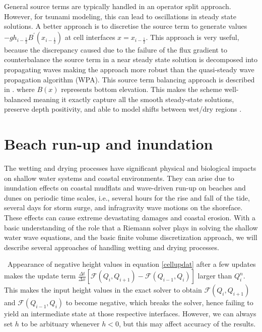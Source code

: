 \documentclass[11pt,a4paper]{article}
\newcommand{\donna}[1]{{\color{red}{#1}}}
\begin{document}
	General source terms are typically handled in an operator split approach.  However, for tsunami modeling, this can lead to oscillations in steady state solutions.  A better approach is to discretise the source term to generate values $-gh_{i-\frac{1}{2}}B^{\prime}(x_{i-\frac{1}{2}})$ at  cell interfaces  $x = x_{i-\frac{1}{2}}$. This approach is very useful, because the discrepancy caused due to the failure of the flux gradient to counterbalance the source term in a near steady state solution is decomposed into propagating waves  making the approach more robust than the quasi-steady wave propagation algorithm (WPA).  This source term balancing approach is described in \cite{ba-le-mi-ro:2003,chaabelasri1849simple}.
	where $B(x)$ represents bottom elevation. This makes the scheme well-balanced  meaning it exactly capture all the smooth steady-state solutions, preserve depth positivity, and able to model shifts between wet/dry regions \cite{ba-le-mi-ro:2003}.


\section{Beach run-up and inundation}
The wetting and drying processes have significant physical and biological impacts on shallow water systems and coastal environments. They can arise due to inundation effects on coastal mudflats and wave-driven run-up on beaches and dunes on periodic time scales, i.e., several hours for the rise and fall of the tide, several days for storm surge, and infragravity wave motions on the shoreface.  These effects can cause extreme devastating damages and coastal erosion.
	With a basic understanding of the role that a Riemann solver plays in solving the shallow water wave equations, and the basic finite volume discretization approach, we will describe several approaches of handling wetting and drying processes.  

\donna{I think you can actually show an equation here.  show how you get negative heights from non-negative heights.   You have the right idea here.}

\
Appearance of negative height values in equation \eqref{cellupdat} after a few updates makes  the update term $  \frac{\Delta t}{\Delta x} \left[ \mathcal{F}(Q_{i} , Q_{i+1} ) - \mathcal{F}(Q_{i-1} , Q_{i} ) \right]$ larger than $Q_{i}^{n}$. This makes the  input height values in the exact solver  to obtain $\mathcal{F}(Q_{i} , Q_{i+1} )$ and $ \mathcal{F}(Q_{i-1} , Q_{i} )$ to become negative, which breaks the solver, hence failing  to yield an intermediate state at those respective interfaces. However, we can always set $h$ to be arbituary whenever $h<0$, but this may affect accuracy of the results.
\end{document}
